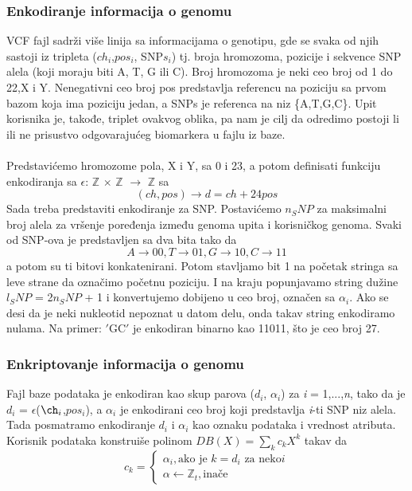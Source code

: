 \documentclass[a4paper]{article}
\begin{document}
\subsubsection{Enkodiranje informacija o genomu}
VCF fajl sadrži više linija sa informacijama o genotipu, gde se svaka od njih sastoji iz tripleta ($ch_i$,$pos_i$, SNP$s_i$) tj. broja hromozoma, pozicije i sekvence SNP alela  (koji moraju biti A, T, G ili C). Broj hromozoma je neki ceo broj od 1 do 22,X i Y. Nenegativni ceo broj pos predstavlja referencu na poziciju sa prvom bazom koja ima poziciju jedan, a SNPs je referenca na niz \{A,T,G,C\}. Upit korisnika je, takođe, triplet ovakvog oblika, pa nam je cilj da odredimo postoji li ili ne prisustvo odgovarajućeg biomarkera u fajlu iz baze. \\\\
Predstavićemo hromozome pola, X i Y, sa 0 i 23, a potom definisati funkciju enkodiranja sa $\epsilon$: $\mathbb{Z}$ $\times$ $\mathbb{Z}$ $\rightarrow$ $\mathbb{Z}$ sa $$(ch, pos) \rightarrow \textit{d} = ch + 24  pos$$
Sada treba predstaviti enkodiranje za SNP. Postavićemo $n_SNP$ za maksimalni broj alela za vršenje poređenja između genoma upita i korisničkog genoma. Svaki od SNP-ova je predstavljen sa dva bita tako da 
$$A \rightarrow 00, T \rightarrow 01, G \rightarrow 10, C \rightarrow 11$$
a potom su ti bitovi konkatenirani. Potom stavljamo bit 1 na početak stringa sa leve strane da označimo početnu poziciju. I na kraju popunjavamo string dužine $\textit{l}_SNP$ = 2$n_SNP$ + 1 i konvertujemo dobijeno u ceo broj, označen sa $\alpha_i$. Ako se desi da je neki nukleotid nepoznat u datom delu, onda takav string enkodiramo nulama. Na primer: $'$GC$'$ je enkodiran binarno kao 11011, što je ceo broj 27.
\subsubsection{Enkriptovanje informacija o genomu}
Fajl baze podataka je enkodiran kao skup parova ($d_i$, $\alpha_i$) za \textit{i} = 1,...,\textit{n}, tako da je $d_i$ = $\epsilon$($\ch_i$,$pos_i$), a $\alpha_i$ je enkodirani ceo broj koji predstavlja \textit{i}-ti SNP niz alela. Tada posmatramo enkodiranje $d_i$ i $\alpha_i$ kao oznaku podataka i vrednost atributa. Korisnik podataka konstruiše polinom $DB(X) = \sum_k c_k X^k$ takav da 
	$$c_k =\left\{
				\begin{array}{lr}
					\alpha_i, \text{ako je $k = d_i$ za neko} \textit{i}\\
					\alpha \leftarrow \mathbb{Z}_t ,\text{inače}
				\end{array}
			\right.$$
\end{document}
